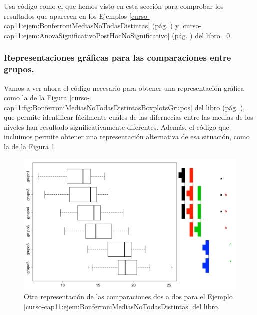 \documentclass[10pt,a4paper]{article}\usepackage[]{graphicx}\usepackage[]{color}
\begin{document}
\begin{ejercicio}
\label{tut11:ejercicio05}
Usa código como el que hemos visto en esta sección para comprobar los resultados que aparecen en los Ejemplos \ref{curso-cap11:ejem:BonferroniMediasNoTodasDistintas} (pág. \pageref{curso-cap11:ejem:BonferroniMediasNoTodasDistintas}) y \ref{curso-cap11:ejem:AnovaSignificativoPostHocNoSignificativo} (pág. \pageref{curso-cap11:ejem:AnovaSignificativoPostHocNoSignificativo}) del libro.
\qed
\end{ejercicio}

\subsubsection*{Representaciones gráficas para las comparaciones entre grupos.}

Vamos a ver ahora el código necesario para obtener una representación gráfica como la de la Figura \ref{curso-cap11:fig:BonferroniMediasNoTodasDistintasBoxplotsGrupos} del libro (pág. \pageref{curso-cap11:fig:BonferroniMediasNoTodasDistintasBoxplotsGrupos}), que permite identificar fácilmente cuáles de las difernecias entre las medias de los niveles han resultado significativamente diferentes. Además, el código que incluimos permite obtener una representación alternativa de esa situación, como la de la Figura \ref{tut11:fig:DiagramaAlternativoEjemploPostHocAnova}

\begin{figure}[htb]
\begin{center}
    \includegraphics[width=12cm]{../fig/Tut11-06.png}
\end{center}
\caption{Otra representación de las comparaciones dos a dos para el Ejemplo \ref{curso-cap11:ejem:BonferroniMediasNoTodasDistintas} del libro.}
\label{tut11:fig:DiagramaAlternativoEjemploPostHocAnova}
\end{figure}
\end{document}
